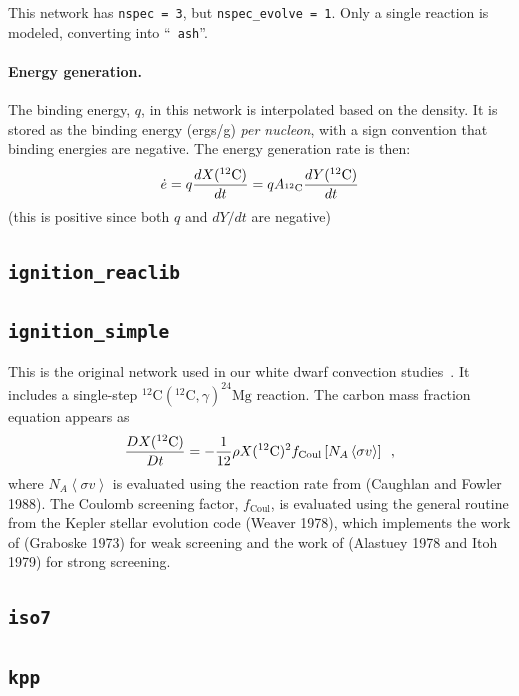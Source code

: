 This network has {\tt nspec = 3}, but {\tt nspec\_evolve = 1}.  Only a
single reaction is modeled, converting  into ``{\tt
  ash}''.

\paragraph{Energy generation.} The binding energy, $q$, in this
network is interpolated based on the density.  It is stored as the
binding energy (ergs/g) {\em per nucleon}, with a sign convention that
binding energies are negative.  The energy generation rate is then:
\begin{equation}
\edot = q \frac{dX(\isotm{C}{12})}{dt} = q A_{\isotm{C}{12}} \frac{dY(\isotm{C}{12})}{dt}
\end{equation}
(this is positive since both $q$ and $dY/dt$ are negative)

\subsection{{\tt ignition\_reaclib}}

\subsection{{\tt ignition\_simple}}

This is the original network used in our white dwarf convection
studies~\cite{lowMach4}.  It includes a single-step
$^{12}\mathrm{C}(^{12}\mathrm{C},\gamma)^{24}\mathrm{Mg}$ reaction.
The carbon mass fraction equation appears as
\begin{equation}
\frac{D X(^{12}\mathrm{C})}{Dt} = - \frac{1}{12} \rho X(^{12}\mathrm{C})^2
    f_\mathrm{Coul} \left [N_A \left <\sigma v \right > \right]\enskip,
\end{equation}
where $N_A \left <\sigma v\right>$ is evaluated using the reaction
rate from (Caughlan and Fowler 1988).  The Coulomb screening factor,
$f_\mathrm{Coul}$, is evaluated using the general routine from the
Kepler stellar evolution code (Weaver 1978), which implements the work
of (Graboske 1973) for weak screening and the work of (Alastuey 1978
and Itoh 1979) for strong screening.


\subsection{{\tt iso7}}


\subsection{{\tt kpp}}



